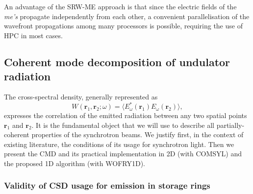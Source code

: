 \documentclass{iucr}
\begin{document}
An advantage of the SRW-ME approach is that since the electric fields of the \textit{me's} propagate independently from each other, a convenient parallelisation of the wavefront propagations among many processors is possible, requiring the use of HPC in most cases.
\subsection{Coherent mode decomposition of undulator radiation}\label{sec:CMD}

The cross-spectral density, generally represented as
\begin{equation}
W(\textbf{r}_1,\textbf{r}_2;\omega) = \big\langle E^*_{\omega}(\textbf{r}_1)  E_{\omega}(\textbf{r}_2)\big\rangle,
\label{eq:CSD_2D}
\end{equation}
expresses the correlation of the emitted radiation between any two spatial points $\textbf{r}_1$ and $\textbf{r}_2$. It is the fundamental object that we will use to describe all partially-coherent properties of the synchrotron beams. We justify first, in the context of existing literature, the conditions of its usage for synchrotron light. Then we present the CMD and its practical implementation in 2D (with COMSYL) and the proposed 1D algorithm (with WOFRY1D).


\subsubsection{Validity of CSD usage for emission in storage rings\\}\label{sec:validity}
\end{document}
